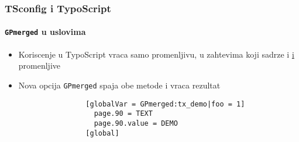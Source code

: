 
\begin{frame}[fragile]
	\frametitle{TSconfig i TypoScript}
	\framesubtitle{\texttt{GPmerged} u uslovima}

	\begin{itemize}

		\item Koriscenje  u TypoScript vraca samo  promenljivu,
		u zahtevima koji sadrze i  \underline{i}
			 promenljive

		\item Nova opcija \texttt{GPmerged} spaja obe metode i vraca rezultat

			\begin{lstlisting}
				[globalVar = GPmerged:tx_demo|foo = 1]
				  page.90 = TEXT
				  page.90.value = DEMO
				[global]
			\end{lstlisting}

	\end{itemize}

\end{frame}


